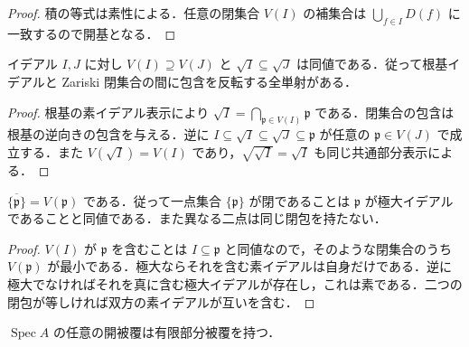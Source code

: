 \begin{proof}
積の等式は素性による．任意の閉集合 $V(I)$ の補集合は $\bigcup_{f\in I}D(f)$ に一致するので開基となる．
\end{proof}
\begin{prop}[閉集合と根基イデアル]
イデアル $I,J$ に対し $V(I)\supseteq V(J)$ と $\sqrt I\subseteq\sqrt J$ は同値である．従って根基イデアルと Zariski 閉集合の間に包含を反転する全単射がある．
\end{prop}
\begin{proof}
根基の素イデアル表示により $\sqrt I=\bigcap_{\mathfrak p\in V(I)}\mathfrak p$ である．閉集合の包含は根基の逆向きの包含を与える．逆に $I\subseteq\sqrt I\subseteq\sqrt J\subseteq\mathfrak p$ が任意の $\mathfrak p\in V(J)$ で成立する．また $V(\sqrt I)=V(I)$ であり，$\sqrt{\sqrt I}=\sqrt I$ も同じ共通部分表示による．
\end{proof}
\begin{prop}[素イデアルの一点閉包]
$\overline{\{\mathfrak p\}}=V(\mathfrak p)$ である．従って一点集合 $\{\mathfrak p\}$ が閉であることは $\mathfrak p$ が極大イデアルであることと同値である．また異なる二点は同じ閉包を持たない．
\end{prop}
\begin{proof}
$V(I)$ が $\mathfrak p$ を含むことは $I\subseteq\mathfrak p$ と同値なので，そのような閉集合のうち $V(\mathfrak p)$ が最小である．極大ならそれを含む素イデアルは自身だけである．逆に極大でなければそれを真に含む極大イデアルが存在し，これは素である．二つの閉包が等しければ双方の素イデアルが互いを含む．
\end{proof}
\begin{prop}[素スペクトルの有限被覆性]
$\operatorname{Spec}A$ の任意の開被覆は有限部分被覆を持つ．
\end{prop}
